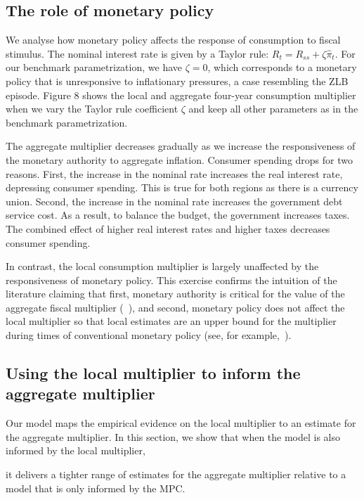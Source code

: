 \documentclass[\latexroot/\projectname]{subfiles}
\begin{document}


\subsection{The role of monetary policy}
We analyse how monetary policy affects the response of consumption to fiscal stimulus. The nominal interest rate is given by a Taylor rule: $R_{t}=R_{s s}+\zeta \hat{\pi}_{t}$. For our benchmark parametrization, we have $\zeta=0$, which corresponds to a monetary policy that is unresponsive to inflationary pressures, a case resembling the ZLB episode. Figure 8 shows the local and aggregate four-year consumption multiplier when we vary the Taylor rule coefficient $\zeta$ and keep all other parameters as in the benchmark parametrization.

The aggregate multiplier decreases gradually as we increase the responsiveness of the monetary authority to aggregate inflation. Consumer spending drops for two reasons. First, the increase in the nominal rate increases the real interest rate, depressing consumer spending. This is true for both regions as there is a currency union. Second, the increase in the nominal rate increases the government debt service cost. As a result, to balance the budget, the government increases taxes. The combined effect of higher real interest rates and higher taxes decreases consumer spending.

In contrast, the local consumption multiplier is largely unaffected by the responsiveness of monetary policy. This exercise confirms the intuition of the literature claiming that first, monetary authority is critical for the value of the aggregate fiscal multiplier (~\cite{Christiano2011-ro}), and second, monetary policy does not affect the local multiplier so that local estimates are an upper bound for the multiplier during times of conventional monetary policy (see, for example,~\cite{Chodorow-Reich2019-zl}).

\subsection{Using the local multiplier to inform the aggregate multiplier}
Our model maps the empirical evidence on the local multiplier to an estimate for the aggregate multiplier. In this section, we show that when the model is also informed by the local multiplier,



it delivers a tighter range of estimates for the aggregate multiplier relative to a model that is only informed by the MPC.
\end{document}
